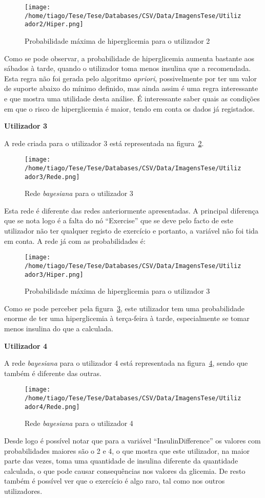 \begin{figure}[H]
\centering
\texttt{[image: /home/tiago/Tese/Tese/Databases/CSV/Data/ImagensTese/Utilizador2/Hiper.png]}
\caption{Probabilidade máxima de hiperglicemia para o utilizador 2}
\label{fig:hiper2}
\end{figure}
Como se pode observar, a probabilidade de hiperglicemia aumenta bastante aos sábados à tarde, quando o utilizador toma menos insulina que a recomendada. Esta regra não foi gerada pelo algoritmo \textit{apriori}, possivelmente por ter um valor de suporte abaixo do mínimo definido, mas ainda assim é uma regra interessante e que mostra uma utilidade desta análise. É interessante saber quais as condições em que o risco de hiperglicemia é maior, tendo em conta os dados já registados. 

\textbf{Utilizador 3}

A rede criada para o utilizador 3 está representada na figura~\ref{fig:sam3}.

\begin{figure}[H]
\centering
\texttt{[image: /home/tiago/Tese/Tese/Databases/CSV/Data/ImagensTese/Utilizador3/Rede.png]}
\caption{Rede \textit{bayesiana} para o utilizador 3}
\label{fig:sam3}
\end{figure}
Esta rede é diferente das redes anteriormente apresentadas. A principal diferença que se nota logo é a falta do nó ``Exercise'' que se deve pelo facto de este utilizador não ter qualquer registo de exercício e portanto, a variável não foi tida em conta. A rede já com as probabilidades é:

\begin{figure}[H]
\centering
\texttt{[image: /home/tiago/Tese/Tese/Databases/CSV/Data/ImagensTese/Utilizador3/Hiper.png]}
\caption{Probabilidade máxima de hiperglicemia para o utilizador 3}
\label{fig:hiper3}
\end{figure}
Como se pode perceber pela figura~\ref{fig:hiper3}, este utilizador tem uma probabilidade enorme de ter uma hiperglicemia à terça-feira à tarde, especialmente se tomar menos insulina do que a calculada. 

\textbf{Utilizador 4}

A rede \textit{bayesiana} para o utilizador 4 está representada na figura~\ref{fig:sam4}, sendo que também é diferente das outras. 

\begin{figure}[H]
\centering
\texttt{[image: /home/tiago/Tese/Tese/Databases/CSV/Data/ImagensTese/Utilizador4/Rede.png]}
\caption{Rede \textit{bayesiana} para o utilizador 4}
\label{fig:sam4}
\end{figure}
Desde logo é possível notar que para a variável ``Insulin\textunderscore Difference'' os valores com probabilidades maiores são o 2 e 4, o que mostra que este utilizador, na maior parte das vezes, toma uma quantidade de insulina diferente da quantidade calculada, o que pode causar consequências nos valores da glicemia. De resto também é possível ver que o exercício é algo raro, tal como nos outros utilizadores. 


